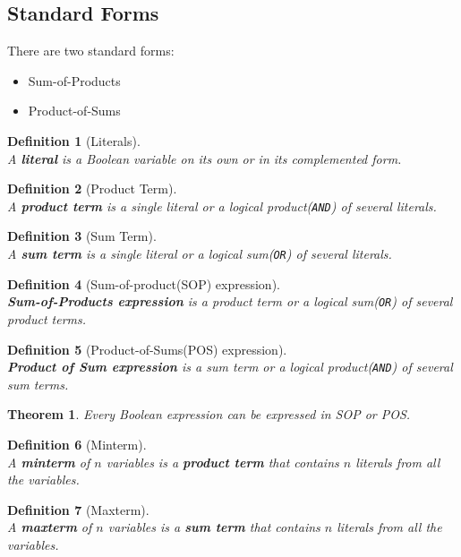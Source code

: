 \documentclass[12pt]{article}
\newtheorem{definition}{Definition}[section]
\newtheorem{theorem}{Theorem}[section]
\theoremstyle{definition}
\begin{document}
\subsection{Standard Forms}
There are two standard forms:
\begin{itemize}
  \item Sum-of-Products
\item Product-of-Sums
\end{itemize}
\begin{definition}[Literals]
\hfill\\\normalfont A \textbf{literal} is a Boolean variable on its own or in its complemented form.
\end{definition}
\begin{definition}[Product Term]
\hfill\\\normalfont A \textbf{product term} is a single literal or a logical product(\texttt{AND}) of several literals.
\end{definition}
\begin{definition}[Sum Term]
\hfill\\\normalfont A \textbf{sum term} is a single literal or a logical sum(\texttt{OR}) of several literals.
\end{definition}
\begin{definition}[Sum-of-product(SOP) expression]
\hfill\\\normalfont \textbf{Sum-of-Products expression} is a product term or a logical sum(\texttt{OR}) of several product terms.
\end{definition}
\begin{definition}[Product-of-Sums(POS) expression]
\hfill\\\normalfont \textbf{Product of Sum expression} is a sum term or a logical product(\texttt{AND}) of several sum terms.
\end{definition}
\begin{theorem}\normalfont Every Boolean expression can be expressed in SOP or POS.
\end{theorem}
\begin{definition}[Minterm]
\hfill\\\normalfont A \textbf{minterm} of $n$ variables is a \textbf{product term} that contains $n$ literals from \textit{all} the variables.
\end{definition}
\begin{definition}[Maxterm]
\hfill\\\normalfont A \textbf{maxterm} of $n$ variables is a \textbf{sum term} that contains $n$ literals from \textit{all} the variables.
\end{definition}
\end{document}
